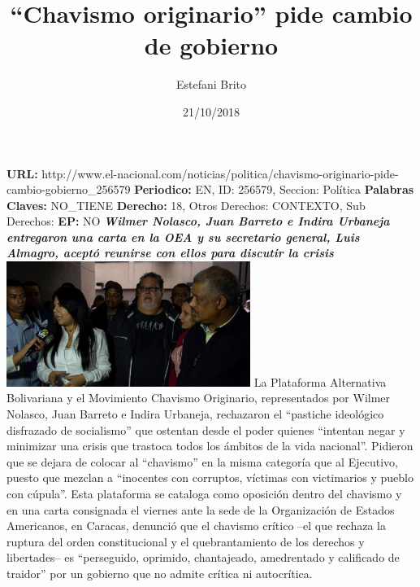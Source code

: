 \documentclass{article}%
\title{\textbf{“Chavismo originario” pide cambio de gobierno}}%
\author{Estefani Brito}%
\date{21/10/2018}%
\begin{document}
%
\normalsize%
\maketitle%
\textbf{URL: }%
http://www.el{-}nacional.com/noticias/politica/chavismo{-}originario{-}pide{-}cambio{-}gobierno\_256579\newline%
%
\textbf{Periodico: }%
EN, %
ID: %
256579, %
Seccion: %
Política\newline%
%
\textbf{Palabras Claves: }%
NO\_TIENE\newline%
%
\textbf{Derecho: }%
18, %
Otros Derechos: %
CONTEXTO, %
Sub Derechos: %
\newline%
%
\textbf{EP: }%
NO\newline%
\newline%
%
\textbf{\textit{Wilmer Nolasco, Juan Barreto e Indira Urbaneja entregaron una carta en la OEA y su secretario general, Luis Almagro, aceptó reunirse con ellos para discutir la crisis}}%
\newline%
\newline%
%
\includegraphics[width=300px]{141.jpg}%
\newline%
%
La Plataforma Alternativa Bolivariana y el Movimiento Chavismo Originario, representados por Wilmer Nolasco, Juan Barreto e Indira Urbaneja, rechazaron el “pastiche ideológico disfrazado de socialismo” que ostentan desde el poder quienes “intentan negar y minimizar una crisis que trastoca todos los ámbitos de la vida nacional”.%
\newline%
%
Pidieron que se dejara de colocar al “chavismo” en la misma categoría que al Ejecutivo, puesto que mezclan a “inocentes con corruptos, víctimas con victimarios y pueblo con cúpula”.%
\newline%
%
Esta plataforma se cataloga como oposición dentro del chavismo y en una carta consignada el viernes ante la sede de la Organización de Estados Americanos, en Caracas, denunció que el chavismo crítico –el que rechaza la ruptura del orden constitucional y el quebrantamiento de los derechos y libertades– es “perseguido, oprimido, chantajeado, amedrentado y calificado de traidor” por un gobierno que no admite crítica ni autocrítica.%
\end{document}
